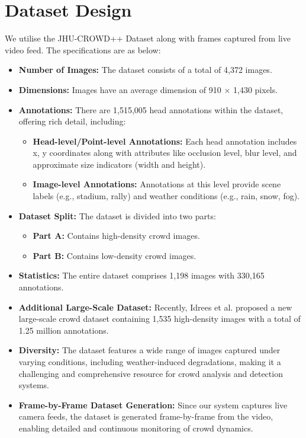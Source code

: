 \documentclass[11pt]{report}
\begin{document}
\section{Dataset Design}

We utilise the JHU-CROWD++ Dataset along with frames captured from live video feed. The specifications are as below: 
\begin{itemize}
    \item \textbf{Number of Images:} The dataset consists of a total of 4,372 images.
    \item \textbf{Dimensions:} Images have an average dimension of 910 × 1,430 pixels.
    \item \textbf{Annotations:} There are 1,515,005 head annotations within the dataset, offering rich detail, including:
    \begin{itemize}
        \item \textbf{Head-level/Point-level Annotations:} Each head annotation includes x, y coordinates along with attributes like occlusion level, blur level, and approximate size indicators (width and height).
        \item \textbf{Image-level Annotations:} Annotations at this level provide scene labels (e.g., stadium, rally) and weather conditions (e.g., rain, snow, fog).
    \end{itemize}
    \item \textbf{Dataset Split:} The dataset is divided into two parts:
    \begin{itemize}
        \item \textbf{Part A:} Contains high-density crowd images.
        \item \textbf{Part B:} Contains low-density crowd images.
    \end{itemize}
    \item \textbf{Statistics:} The entire dataset comprises 1,198 images with 330,165 annotations.
    \item \textbf{Additional Large-Scale Dataset:} Recently, Idrees et al. proposed a new large-scale crowd dataset containing 1,535 high-density images with a total of 1.25 million annotations.
    \item \textbf{Diversity:} The dataset features a wide range of images captured under varying conditions, including weather-induced degradations, making it a challenging and comprehensive resource for crowd analysis and detection systems.
    \item \textbf{Frame-by-Frame Dataset Generation:} Since our system captures live camera feeds, the dataset is generated frame-by-frame from the video, enabling detailed and continuous monitoring of crowd dynamics.
\end{itemize}
\end{document}

